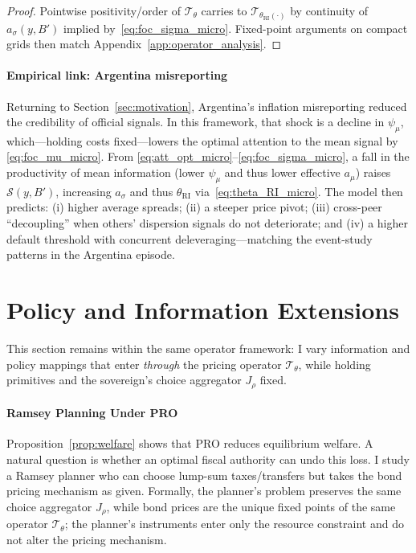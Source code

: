 \documentclass[12pt]{article}
\theoremstyle{plain}
\begin{document}
\begin{proof}
	Pointwise positivity/order of $\mathcal T_\theta$ carries to
	$\mathcal T_{\theta_{\mathrm{RI}}(\cdot)}$ by continuity of $a_\sigma(y,B')$ implied by~\eqref{eq:foc_sigma_micro}. Fixed-point arguments on compact grids then match Appendix~\ref{app:operator_analysis}.
\end{proof}

\paragraph{Empirical link: Argentina misreporting}
Returning to Section~\ref{sec:motivation}, Argentina's inflation misreporting
reduced the credibility of official signals. In this framework, that shock is a
decline in $\psi_\mu$, which—holding costs fixed—lowers the optimal attention
to the mean signal by \eqref{eq:foc_mu_micro}. From
\eqref{eq:att_opt_micro}–\eqref{eq:foc_sigma_micro}, a fall in the productivity
of mean information (lower $\psi_\mu$ and thus lower effective $a_\mu$) raises
$\mathcal S(y,B')$, increasing $a_\sigma$ and thus $\theta_{\mathrm{RI}}$
via~\eqref{eq:theta_RI_micro}. The model then predicts: (i) higher average
spreads; (ii) a steeper price pivot; (iii) cross-peer “decoupling” when others’
dispersion signals do not deteriorate; and (iv) a higher default threshold with
concurrent deleveraging—matching the event-study patterns in the Argentina
episode.

\section{Policy and Information Extensions}\label{sec:extensions}

This section remains within the same operator framework: I vary information and
policy mappings that enter \emph{through} the pricing operator $\mathcal
	T_\theta$, while holding primitives and the sovereign's choice aggregator
$J_\rho$ fixed.

\paragraph{Ramsey Planning Under PRO}\label{sec:ramsey}
Proposition~\ref{prop:welfare} shows that PRO reduces equilibrium welfare. A
natural question is whether an optimal fiscal authority can undo this loss. I
study a Ramsey planner who can choose lump-sum taxes/transfers but takes the
bond pricing mechanism as given. Formally, the planner's problem preserves the
same choice aggregator $J_\rho$, while bond prices are the unique fixed points
of the same operator $\mathcal T_\theta$; the planner's instruments enter only
the resource constraint and do not alter the pricing mechanism.
\end{document}
